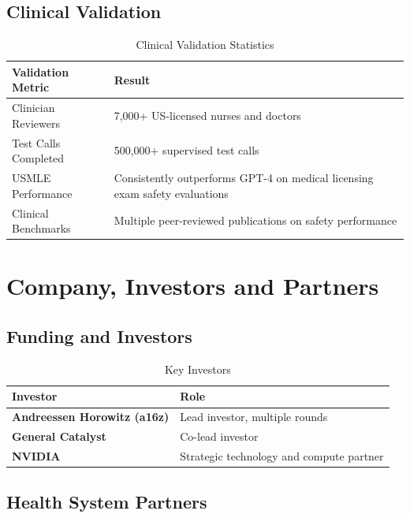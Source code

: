 \documentclass[12pt,a4paper]{article}
\begin{document}
\subsection{Clinical Validation}

\begin{table}[H]
\centering
\renewcommand{\arraystretch}{1.4}
\begin{tabularx}{\textwidth}{lX}
\toprule
\textbf{Validation Metric} & \textbf{Result} \\
\midrule
Clinician Reviewers    & 7,000+ US-licensed nurses and doctors \\
Test Calls Completed   & 500,000+ supervised test calls \\
USMLE Performance      & Consistently outperforms GPT-4 on medical licensing exam safety evaluations \\
Clinical Benchmarks    & Multiple peer-reviewed publications on safety performance \\
\bottomrule
\end{tabularx}
\caption{Clinical Validation Statistics}
\end{table}

\newpage

\section{Company, Investors and Partners}

\subsection{Funding and Investors}

\begin{table}[H]
\centering
\renewcommand{\arraystretch}{1.4}
\begin{tabularx}{\textwidth}{lX}
\toprule
\textbf{Investor} & \textbf{Role} \\
\midrule
\textbf{Andreessen Horowitz (a16z)} & Lead investor, multiple rounds \\
\textbf{General Catalyst} & Co-lead investor \\
\textbf{NVIDIA} & Strategic technology and compute partner \\
\bottomrule
\end{tabularx}
\caption{Key Investors}
\end{table}

\subsection{Health System Partners}
\end{document}

